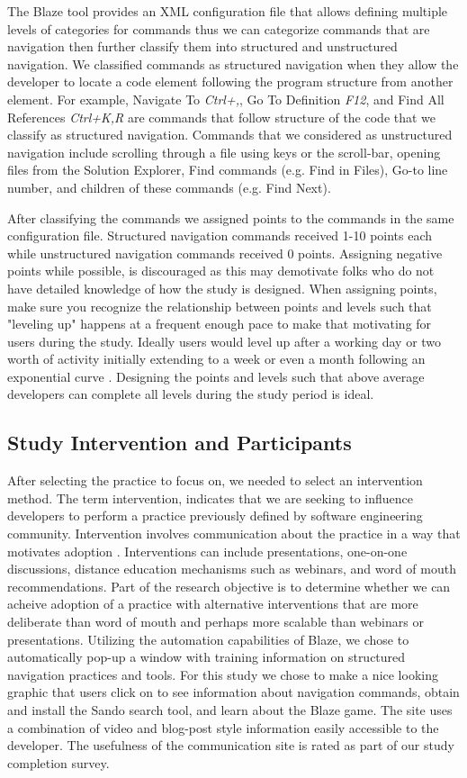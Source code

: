 \documentclass{sig-alternate}
\begin{document}
The Blaze tool provides an XML configuration file that allows defining multiple levels of categories for commands thus we can categorize commands that are navigation then further classify them into structured and unstructured navigation.
We classified commands as structured navigation when they allow the developer to locate a code element following the program structure from another element.  For example, Navigate To \textit{Ctrl+,}, Go To Definition \textit{F12}, and Find All References \textit{Ctrl+K,R} are commands that follow structure of the code that we classify as structured navigation.
Commands that we considered as unstructured navigation include scrolling through a file using keys or the scroll-bar, opening files from the Solution Explorer, Find commands (e.g. Find in Files), Go-to line number, and children of these commands (e.g. Find Next).

After classifying the commands we assigned points to the commands in the same configuration file.  Structured navigation commands received 1-10 points each while unstructured navigation commands received 0 points.  Assigning negative points while possible, is discouraged as this may demotivate folks who do not have detailed knowledge of how the study is designed.  When assigning points, make sure you recognize the relationship between points and levels such that "leveling up" happens at a frequent enough pace to make that motivating for users during the study.  Ideally users would level up after a working day or two worth of activity initially extending to a week or even a month following an exponential curve \cite{}.  Designing the points and levels such that above average developers can complete all levels during the study period is ideal.

\subsection{Study Intervention and Participants}

After selecting the practice to focus on, we needed to select an intervention method.  The term intervention, indicates that we are seeking to influence developers to perform a practice previously defined by software engineering community.  Intervention involves communication about the practice in a way that motivates adoption \cite{}.  Interventions can include presentations, one-on-one discussions, distance education mechanisms such as webinars, and word of mouth recommendations.  Part of the research objective is to determine whether we can acheive adoption of a practice with alternative interventions that are more deliberate than word of mouth and perhaps more scalable than webinars or presentations.  Utilizing the automation capabilities of Blaze, we chose to automatically pop-up a window with training information on structured navigation practices and tools. For this study we chose to make a nice looking graphic that users click on to see information about navigation commands, obtain and install the Sando search tool, and learn about the Blaze game.  The site uses a combination of video and blog-post style information easily accessible to the developer.  The usefulness of the communication site is rated as part of our study completion survey.
\end{document}
